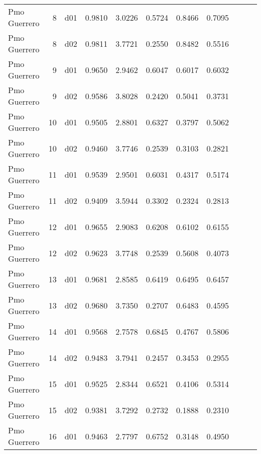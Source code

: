 \begin{landscape}
\begin{longtable}{p{2cm}rrrrrrrrrr}
         Pmo Guerrero  &          8 &     d01 &   0.9810 &  3.0226 &        0.5724 &           0.8466 &  0.7095 \\
         Pmo Guerrero  &          8 &     d02 &   0.9811 &  3.7721 &        0.2550 &           0.8482 &  0.5516 \\
         Pmo Guerrero  &          9 &     d01 &   0.9650 &  2.9462 &        0.6047 &           0.6017 &  0.6032 \\
         Pmo Guerrero  &          9 &     d02 &   0.9586 &  3.8028 &        0.2420 &           0.5041 &  0.3731 \\
         Pmo Guerrero  &         10 &     d01 &   0.9505 &  2.8801 &        0.6327 &           0.3797 &  0.5062 \\
         Pmo Guerrero  &         10 &     d02 &   0.9460 &  3.7746 &        0.2539 &           0.3103 &  0.2821 \\
         Pmo Guerrero  &         11 &     d01 &   0.9539 &  2.9501 &        0.6031 &           0.4317 &  0.5174 \\
         Pmo Guerrero  &         11 &     d02 &   0.9409 &  3.5944 &        0.3302 &           0.2324 &  0.2813 \\
         Pmo Guerrero  &         12 &     d01 &   0.9655 &  2.9083 &        0.6208 &           0.6102 &  0.6155 \\
         Pmo Guerrero  &         12 &     d02 &   0.9623 &  3.7748 &        0.2539 &           0.5608 &  0.4073 \\
         Pmo Guerrero  &         13 &     d01 &   0.9681 &  2.8585 &        0.6419 &           0.6495 &  0.6457 \\
         Pmo Guerrero  &         13 &     d02 &   0.9680 &  3.7350 &        0.2707 &           0.6483 &  0.4595 \\
         Pmo Guerrero  &         14 &     d01 &   0.9568 &  2.7578 &        0.6845 &           0.4767 &  0.5806 \\
         Pmo Guerrero  &         14 &     d02 &   0.9483 &  3.7941 &        0.2457 &           0.3453 &  0.2955 \\
         Pmo Guerrero  &         15 &     d01 &   0.9525 &  2.8344 &        0.6521 &           0.4106 &  0.5314 \\
         Pmo Guerrero  &         15 &     d02 &   0.9381 &  3.7292 &        0.2732 &           0.1888 &  0.2310 \\
         Pmo Guerrero  &         16 &     d01 &   0.9463 &  2.7797 &        0.6752 &           0.3148 &  0.4950 \\

\end{longtable}
\end{landscape}
